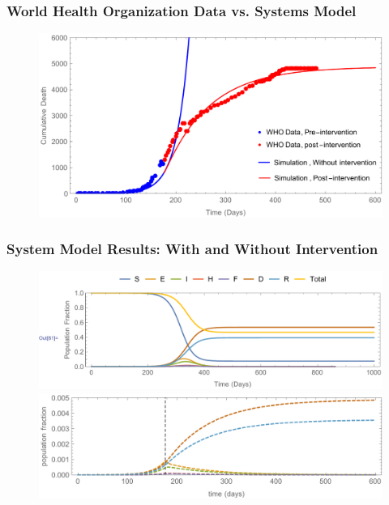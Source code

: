 \documentclass[30pt]{beamer}
\begin{document}
\begin{frame}
\frametitle{World Health Organization Data vs. Systems Model}
\begin{figure}[!h]
  \centering
  \includegraphics[width=1\textwidth]{ValidationPlot.pdf}
 \end{figure}
\end{frame}



\begin{frame}
\frametitle{System Model Results: With and Without Intervention}
\begin{figure}[!h]
  \centering
  \includegraphics[width=1\textwidth]{SEIPlotNoInt.pdf}
\label{fig:LB_IM_NoIn} 
 \includegraphics[width=\textwidth]{SEIPlotIntRescale.pdf}  \label{fig:LB_IM_In2} %
\label{fig:LB_IM_In} 
\end{figure}
\end{frame}
\end{document}
